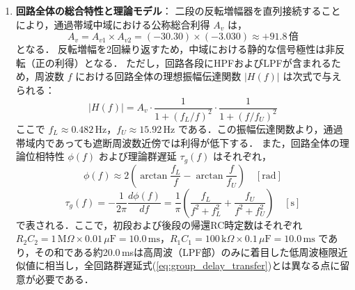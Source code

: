 \begin{enumerate}
  \item \textbf{回路全体の総合特性と理論モデル}：
        二段の反転増幅器を直列接続することにより，通過帯域中域における公称総合利得 $A_v$ は，
        \begin{equation}
          A_v = A_{v1} \times A_{v2} = (-30.30) \times (-3.030) \approx +91.8\,\text{倍}
          \label{eq:total_gain}
        \end{equation}
        となる．
        反転増幅を2回繰り返すため，中域における静的な信号極性は非反転（正の利得）となる．
        ただし，回路各段にHPFおよびLPFが含まれるため，周波数 $f$ における回路全体の理想振幅伝達関数 $|H(f)|$ は次式で与えられる：
        \begin{equation}
          |H(f)| = A_v \cdot \frac{1}{1 + (f_L/f)^2} \cdot \frac{1}{1 + (f/f_U)^2}
          \label{eq:amplitude_transfer}
        \end{equation}
        ここで $f_L \approx 0.482\,\mathrm{Hz}$，$f_U \approx 15.92\,\mathrm{Hz}$ である．この振幅伝達関数より，通過帯域内であっても遮断周波数近傍では利得が低下する．
        また，回路全体の理論位相特性 $\phi(f)$ および理論群遅延 $\tau_g(f)$ はそれぞれ，
        \begin{equation}
          \phi(f) \approx 2 \left( \arctan\frac{f_L}{f} - \arctan\frac{f}{f_U} \right) \quad [\mathrm{rad}]
          \label{eq:phase_transfer}
        \end{equation}
        \begin{equation}
          \tau_g(f) = -\frac{1}{2\pi}\frac{d\phi(f)}{df} = \frac{1}{\pi} \left( \frac{f_L}{f^2 + f_L^2} + \frac{f_U}{f^2 + f_U^2} \right) \quad [\mathrm{s}]
          \label{eq:group_delay_transfer}
        \end{equation}
        で表される．ここで，初段および後段の帰還RC時定数はそれぞれ $R_2 C_2 = 1\,\mathrm{M}\Omega \times 0.01\,\mu\mathrm{F} = 10.0\,\mathrm{ms}$，$R_1 C_1 = 100\,\mathrm{k}\Omega \times 0.1\,\mu\mathrm{F} = 10.0\,\mathrm{ms}$ であり，その和である約20.0\,msは高周波（LPF部）のみに着目した低周波極限近似値に相当し，全回路群遅延式(\ref{eq:group_delay_transfer})とは異なる点に留意が必要である．


\end{enumerate}
